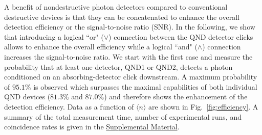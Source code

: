 \documentclass[prl,amsmath,amssymb,bibnotes,aps,longbibliography,12pt]{revtex4-1}
\newcommand{\braket}[1]{\langle{#1}\rangle}
\begin{document}
A benefit of nondestructive photon detectors compared to conventional destructive devices is that they can be concatenated to enhance the overall detection efficiency or the signal-to-noise ratio (SNR). In the following, we show that introducing a logical ``or" ($\lor$) connection between the QND detector clicks allows to enhance the overall efficiency while a logical ``and" ($\land$) connection increases the signal-to-noise ratio. We start with the first case and measure the probability that at least one detector, QND1 or QND2, detects a photon conditioned on an absorbing-detector click downstream. A maximum probability of $95.1\%$ is observed which surpasses the maximal capabilities of both individual QND devices ($81.3\%$ and $87.0\%$) and therefore shows the enhancement of the detection efficiency. Data as a function of $\braket{n}$ are shown in Fig.~\ref{fig:efficiency}. A summary of the total measurement time, number of experimental runs, and coincidence rates is given in the \hyperref[supplement]{Supplemental Material}. 
\end{document}
